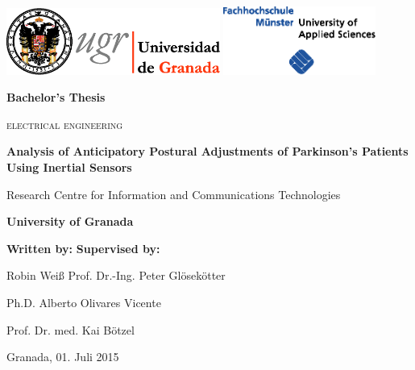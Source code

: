 \begin{titlepage}
\label{ch:titlepage}
\begin{center}

\includegraphics[width=7cm]{images/universidad_de_granada.eps}
	\hfill
\includegraphics[width=5cm]{images/fh-muenster.eps}
	\\ 

\vspace{3cm}

\Large\textbf{Bachelor's Thesis}

\large\textsc{electrical engineering}

\vspace{1cm}

{\huge\textbf{Analysis of Anticipatory Postural Adjustments of Parkinson's Patients Using Inertial Sensors}}

\vspace{1cm}

Research Centre for Information and Communications Technologies

\textbf{University of Granada}

\end{center}

\vspace{1.5cm}

\textbf{Written by:}  \hfill \textbf{Supervised by:}

Robin Weiß \hfill Prof. Dr.-Ing. Peter Gl\"{o}sek\"{o}tter 

\hfill Ph.D. Alberto Olivares Vicente

\hfill Prof. Dr. med. Kai B\"{o}tzel

\vfill

Granada, 01. Juli 2015

\end{titlepage}
